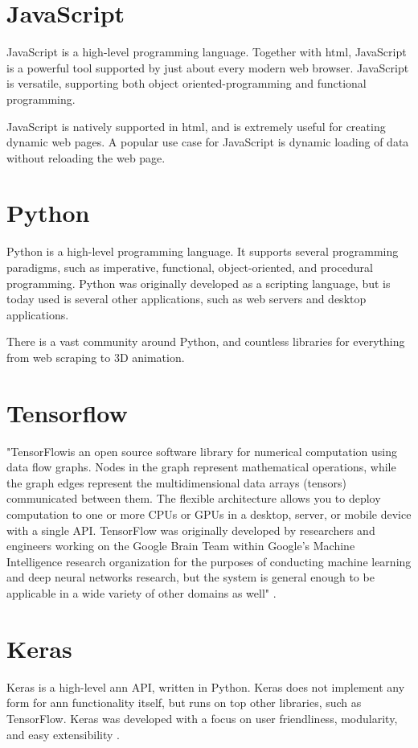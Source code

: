 \section{JavaScript}

JavaScript is a high-level programming language. Together with \gls{html}, JavaScript is a powerful tool supported by just about every modern web browser. JavaScript is versatile, supporting both object oriented-programming and functional programming.

JavaScript is natively supported in \gls{html}, and is extremely useful for creating dynamic web pages. A popular use case for JavaScript is dynamic loading of data without reloading the web page.


\section{Python}

Python is a high-level programming language. It supports several programming paradigms, such as imperative, functional, object-oriented, and procedural programming. Python was originally developed as a scripting language, but is today used is several other applications, such as web servers and desktop applications.

There is a vast community around Python, and countless libraries for everything from web scraping to 3D animation.


\section{Tensorflow}

"TensorFlow\texttrademark is an open source software library for numerical computation using data flow graphs. Nodes in the graph represent mathematical operations, while the graph edges represent the multidimensional data arrays (tensors) communicated between them. The flexible architecture allows you to deploy computation to one or more CPUs or GPUs in a desktop, server, or mobile device with a single API. TensorFlow was originally developed by researchers and engineers working on the Google Brain Team within Google's Machine Intelligence research organization for the purposes of conducting machine learning and deep neural networks research, but the system is general enough to be applicable in a wide variety of other domains as well" \citep{bib:tensorflow}.


\section{Keras}

Keras is a high-level \gls{ann} API, written in Python. Keras does not implement any form for \gls{ann} functionality itself, but runs on top other libraries, such as TensorFlow. Keras was developed with a focus on user friendliness, modularity, and easy extensibility \citep{bib:keras}.